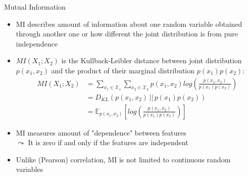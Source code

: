 \documentclass[11pt,compress,t,notes=noshow, aspectratio=169, xcolor=table]{beamer}
\begin{document}
\begin{frame}{Mutual Information}
    \begin{itemize}
        \item MI describes amount of information about one random variable obtained through another one or how different the joint distribution is from pure independence
        \item $MI(X_1 ; X_2 )$ is the Kullback-Leibler distance between joint distribution $p(x_1, x_2)$ and the product of their marginal distribution $p(x_1) p(x_2)$:
        \begin{align*}
            MI(X_1 ; X_2 ) &= \sum_{x_1 \in \mathcal{X}_1} \sum_{x_2 \in \mathcal{X}_2} p(x_1, x_2) log\left(\frac{p(x_1, x_2)}{p(x_1) p(x_2)} \right) \\
            &= D_{KL} \left( p(x_1, x_2) \, || \, p(x_1) p(x_2) \right) \\
            &= \mathbb{E}_{p(x_1, x_2)} \left[ log\left(\frac{p(x_1, x_2)}{p(x_1) p(x_2)} \right) \right]
        \end{align*}
        \item MI measures amount of "dependence" between features\\
        $\leadsto$ It is zero if and only if the features are independent
        \item Unlike (Pearson) correlation, MI is not limited to continuous random variables%
    \end{itemize}
\end{frame}
\end{document}
